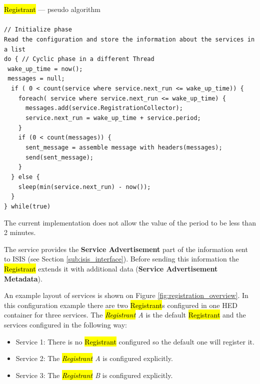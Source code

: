 \documentclass{book}
\begin{document}
\begin{framed}
  \hl{Registrant} --- pseudo algorithm\\
  \\
  \verb#// Initialize phase#\\
  \verb#Read the configuration and store the information about the services in a list#\\
  \verb#do { // Cyclic phase in a different Thread#\\
  \verb# wake_up_time = now();#\\
  \verb# messages = null;#\\
  \verb#  if ( 0 < count(service where service.next_run <= wake_up_time)) {#\\
  \verb#    foreach( service where service.next_run <= wake_up_time) {#\\
  \verb#      messages.add(service.RegistrationCollector);#\\
  \verb#      service.next_run = wake_up_time + service.period;#\\
  \verb#    }#\\
  \verb#    if (0 < count(messages)) {#\\
  \verb#      sent_message = assemble message with headers(messages);#\\
  \verb#      send(sent_message);#\\
  \verb#    }#\\
  \verb#  } else {#\\
  \verb#    sleep(min(service.next_run) - now()); #\\
  \verb#  }#\\
  \verb#} while(true)#\\
\end{framed}
The current implementation does not allow the value of the period to be less than 2 minutes.

The service provides the \textbf{Service Advertisement} part of the information sent to ISIS (see Section \ref{sub:isis_interface}).
Before sending this information the \hl{Registrant} extends it with additional data (\textbf{Service Advertisement Metadata}).

An example layout of services is shown on Figure \ref{fig:registration_overview}. In this configuration example 
there are two \hl{Registrant}s configured in one HED container for three services. The \textit{\hl{Registrant} A} is the 
default \hl{Registrant} and the services configured in the following way:

\begin{itemize}
  \item Service 1: There is no \hl{Registrant} configured so the default one will register it.
  \item Service 2: The \textit{\hl{Registrant} A} is configured explicitly.
  \item Service 3: The \textit{\hl{Registrant} B} is configured explicitly.
\end{itemize}
\end{document}
